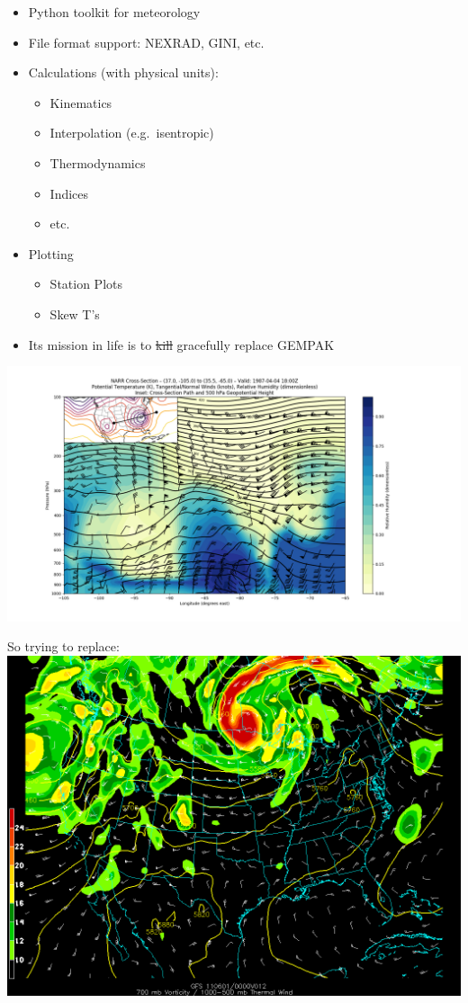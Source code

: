 \documentclass[11pt]{article}
\makeatletter
\def\maxwidth{\ifdim\Gin@nat@width>\linewidth\linewidth
    \else\Gin@nat@width\fi}
\let\Oldincludegraphics\includegraphics
\renewcommand{\includegraphics}[1]{\Oldincludegraphics[width=.8\maxwidth]{#1}}
\providecommand{\tightlist}{%
      \setlength{\itemsep}{0pt}\setlength{\parskip}{0pt}}
\makeatother
\begin{document}
\begin{itemize}
\tightlist
\item
  Python toolkit for meteorology
\item
  File format support: NEXRAD, GINI, etc.
\item
  Calculations (with physical units):

  \begin{itemize}
  \tightlist
  \item
    Kinematics
  \item
    Interpolation (e.g.~isentropic)
  \item
    Thermodynamics
  \item
    Indices
  \item
    etc.
  \end{itemize}
\item
  Plotting

  \begin{itemize}
  \tightlist
  \item
    Station Plots
  \item
    Skew T's
  \end{itemize}
\item
  Its mission in life is to \sout{kill} gracefully replace GEMPAK
\end{itemize}

    

    \includegraphics{sphx_glr_cross_section_001.png}

    So trying to replace: \includegraphics{./us-trenberth.gif}
\end{document}
